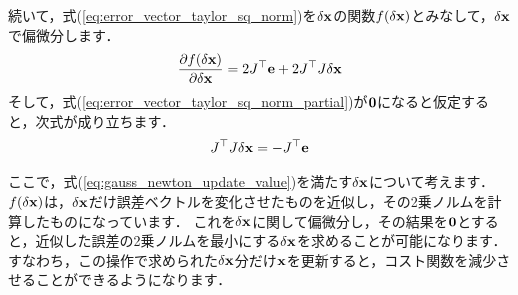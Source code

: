 続いて，式(\ref{eq:error_vector_taylor_sq_norm})を$\delta {\bf x}$の関数$f( \delta {\bf x} )$とみなして，$\delta {\bf x}$で偏微分します．
%
\begin{align}
  \frac{ \partial f( \delta {\bf x} ) }{ \partial \delta {\bf x} } = 2 J^{\top} {\bf e} + 2 J^{\top} J \delta {\bf x}
  \label{eq:error_vector_taylor_sq_norm_partial}
\end{align}
%
そして，式(\ref{eq:error_vector_taylor_sq_norm_partial})が${\bf 0}$になると仮定すると，次式が成り立ちます．
%
\begin{align}
  J^{\top} J \delta {\bf x} = -J^{\top} {\bf e}
  \label{eq:gauss_newton_update_value}
\end{align}

ここで，式(\ref{eq:gauss_newton_update_value})を満たす$\delta {\bf x}$について考えます．
$f( \delta {\bf x} )$は，$\delta {\bf x}$だけ誤差ベクトルを変化させたものを近似し，その2乗ノルムを計算したものになっています．
これを$\delta {\bf x}$に関して偏微分し，その結果を${\bf 0}$とすると，近似した誤差の2乗ノルムを最小にする$\delta {\bf x}$を求めることが可能になります．
すなわち，この操作で求められた$\delta {\bf x}$分だけ${\bf x}$を更新すると，コスト関数を減少させることができるようになります．

